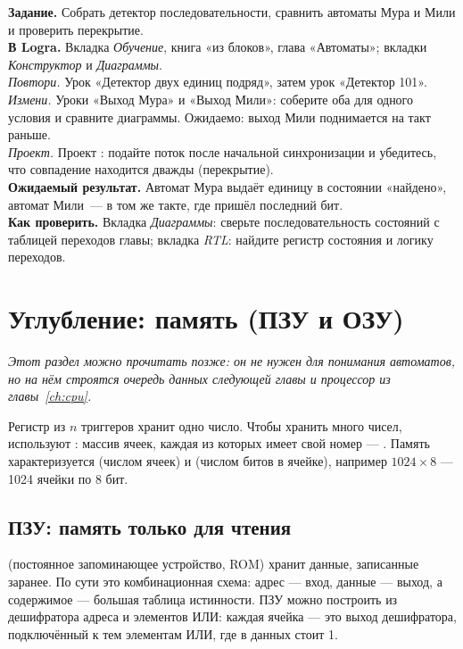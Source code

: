 \begin{diybox}
\textbf{Задание.} Собрать детектор последовательности, сравнить автоматы Мура
и Мили и проверить перекрытие.\\
\textbf{В Logra.} Вкладка \emph{Обучение}, книга «из блоков», глава
«Автоматы»; вкладки \emph{Конструктор} и \emph{Диаграммы}.\\
 \emph{Повтори.} Урок «Детектор двух единиц подряд», затем урок
«Детектор 101».\\
 \emph{Измени.} Уроки «Выход Мура» и «Выход Мили»: соберите оба для
одного условия и сравните диаграммы. Ожидаемо: выход Мили поднимается на такт
раньше.\\
 \emph{Проект.} Проект : подайте поток
 после начальной синхронизации и убедитесь, что совпадение
находится дважды (перекрытие).\\
\textbf{Ожидаемый результат.} Автомат Мура выдаёт единицу в состоянии
«найдено», автомат Мили~--- в том же такте, где пришёл последний бит.\\
\textbf{Как проверить.} Вкладка \emph{Диаграммы}: сверьте последовательность
состояний с таблицей переходов главы; вкладка \emph{RTL}: найдите регистр
состояния и логику переходов.
\end{diybox}

\section{Углубление: память (ПЗУ и ОЗУ)}
\label{sec:memory}

\emph{Этот раздел можно прочитать позже: он не нужен для понимания автоматов,
но на нём строятся очередь данных следующей главы и процессор из главы~\ref{ch:cpu}.}

Регистр из $n$ триггеров хранит одно число. Чтобы хранить много чисел,
используют : массив ячеек, каждая из которых имеет свой номер ---
. Память характеризуется  (числом ячеек) и
 (числом битов в ячейке), например $1024 \times 8$ ---
1024 ячейки по 8 бит.

\subsection{ПЗУ: память только для чтения}

 (постоянное запоминающее устройство, ROM) хранит данные, записанные
заранее. По сути это комбинационная схема: адрес --- вход, данные --- выход,
а содержимое --- большая таблица истинности. ПЗУ можно построить из
дешифратора адреса и элементов ИЛИ: каждая ячейка --- это выход дешифратора,
подключённый к тем элементам ИЛИ, где в данных стоит 1.

